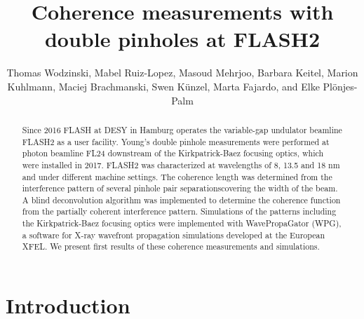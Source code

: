 \documentclass{osa-article}
\begin{document}
\title{Coherence measurements with double pinholes at FLASH2}

\author{Thomas Wodzinski, Mabel Ruiz-Lopez, Masoud Mehrjoo, Barbara Keitel, Marion Kuhlmann, Maciej Brachmanski, Swen K\"{u}nzel, Marta Fajardo, and Elke Pl\"{o}njes-Palm}

\address{GoLP/Instituto de Plasmas e Fus\~{a}o Nuclear, Instituto Superior T\'{e}cnico, 1049-001 Lisboa, Portugal\\
Deutsches Elektronen-Synchrotron DESY, Notkestrasse 85, 22607 Hamburg, Germany}




\begin{abstract}

Since 2016 FLASH at DESY in Hamburg operates the variable-gap undulator beamline FLASH2 as a user facility. Young's double pinhole measurements were performed at photon beamline FL24 downstream of the Kirkpatrick-Baez focusing optics, which were installed in 2017. FLASH2 was characterized at wavelengths of 8, 13.5 and 18 nm and under different machine settings. The coherence length was determined from the interference pattern of several pinhole pair separationscovering the width of the beam. A blind deconvolution algorithm was implemented to determine the coherence function from the partially coherent interference pattern. Simulations of the patterns including the Kirkpatrick-Baez focusing optics were implemented with WavePropaGator (WPG), a software for X-ray wavefront propagation simulations developed at the European XFEL. We present first results of these coherence measurements and simulations.
\end{abstract}

\section{Introduction}





\end{document}
